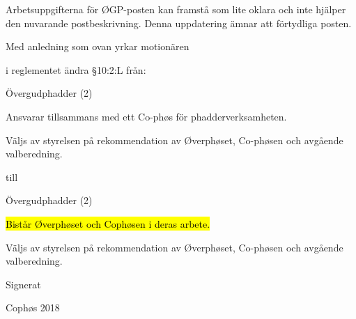 \documentclass[../_main/handlingar.tex]{subfiles}
\begin{document}
Arbetsuppgifterna för ØGP-posten kan framstå som lite oklara och inte hjälper den nuvarande
postbeskrivning. Denna uppdatering ämnar att förtydliga posten.

Med anledning som ovan yrkar motionären

\begin{attsatser}
  \att i reglementet ändra \S10:2:L från:\par
  \begin{emptylist}
    \item Övergudphadder (2)
      \begin{dashlist}
        \item Ansvarar tillsammans med ett Co-phøs för phadderverksamheten.
        \item Väljs av styrelsen på rekommendation av Øverphøset, Co-phøsen och avgående
        valberedning.
      \end{dashlist}
    \end{emptylist}
    
    till 
    
    \begin{emptylist}
        \item Övergudphadder (2)
        \begin{dashlist}
          \item \hl{Bistår Øverphøset och Cophøsen i deras arbete.}
          \item Väljs av styrelsen på rekommendation av Øverphøset, Co-phøsen och avgående
          valberedning.
        \end{dashlist}
    \end{emptylist}
  \changenote
\end{attsatser}




\begin{signatures}{1}
    Signerat
    \signature{Edvard Carlsson}{Cophøs 2018}

\end{signatures}
\end{document}
